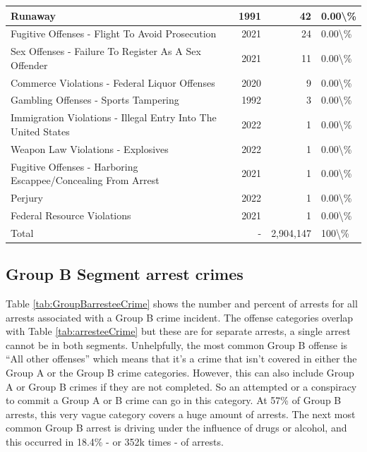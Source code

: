 \documentclass[
]{krantz}
\begin{document}
\begin{longtable}[t]{l|r|r|l}
\hline
Runaway & 1991 & 42 & 0.00\textbackslash{}\%\\
\hline
Fugitive Offenses - Flight To Avoid Prosecution & 2021 & 24 & 0.00\textbackslash{}\%\\
\hline
Sex Offenses - Failure To Register As A Sex Offender & 2021 & 11 & 0.00\textbackslash{}\%\\
\hline
Commerce Violations - Federal Liquor Offenses & 2020 & 9 & 0.00\textbackslash{}\%\\
\hline
Gambling Offenses - Sports Tampering & 1992 & 3 & 0.00\textbackslash{}\%\\
\hline
Immigration Violations - Illegal Entry Into The United States & 2022 & 1 & 0.00\textbackslash{}\%\\
\hline
Weapon Law Violations - Explosives & 2022 & 1 & 0.00\textbackslash{}\%\\
\hline
Fugitive Offenses - Harboring Escappee/Concealing From Arrest & 2021 & 1 & 0.00\textbackslash{}\%\\
\hline
Perjury & 2022 & 1 & 0.00\textbackslash{}\%\\
\hline
Federal Resource Violations & 2021 & 1 & 0.00\textbackslash{}\%\\
\hline
Total & - & 2,904,147 & 100\textbackslash{}\%\\
\hline
\end{longtable}

\subsection{Group B Segment arrest
crimes}\label{group-b-segment-arrest-crimes}

Table \ref{tab:GroupBarresteeCrime} shows the number and
percent of arrests for all arrests associated with a Group B
crime incident. The offense categories overlap with Table
\ref{tab:arresteeCrime} but these are for separate arrests,
a single arrest cannot be in both segments. Unhelpfully, the
most common Group B offense is ``All other offenses'' which
means that it's a crime that isn't covered in either the
Group A or the Group B crime categories. However, this can
also include Group A or Group B crimes if they are not
completed. So an attempted or a conspiracy to commit a Group
A or B crime can go in this category. At 57\% of Group B
arrests, this very vague category covers a huge amount of
arrests. The next most common Group B arrest is driving
under the influence of drugs or alcohol, and this occurred
in 18.4\% - or 352k times - of arrests.
\end{document}
